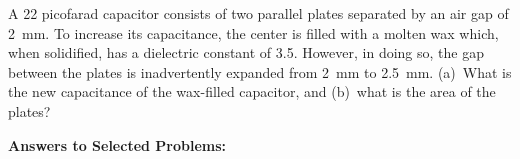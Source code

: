 \begin{Exercise}
A 22 picofarad capacitor consists of two parallel plates separated by an air gap of 2~mm.  
To increase its capacitance, the center is filled with a molten wax which, when solidified, has a dielectric constant of 3.5.  
However, in doing so, the gap between the plates is inadvertently expanded from 2~mm to 2.5~mm.  (a)~What is the new capacitance of the wax-filled capacitor, and (b)~what is the area of the plates?
\end{Exercise}




\vspace{0.7in}

\textbf{Answers to Selected {\thesubsection} Problems:}
\label{circuit_prob_answers}
\shipoutAnswer

\cleardoublepage
